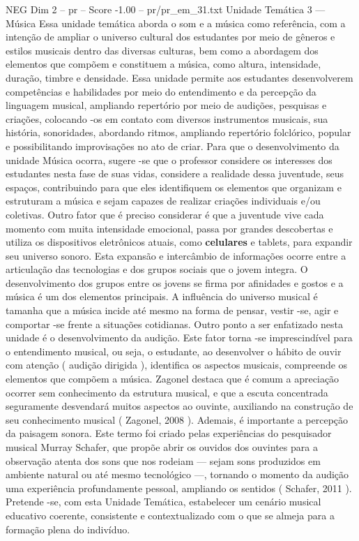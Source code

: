\begin{textsample}{NEG Dim 2 – pr – Score -1.00 – pr/pr\_em\_31.txt}  \label{ex:f2_neg_179}
Unidade Temática 3 — Música Essa unidade temática aborda o som e a música como referência, com a intenção de ampliar o universo cultural dos estudantes por meio de gêneros e estilos musicais dentro das diversas culturas, bem como a abordagem dos elementos que compõem e constituem a música, como altura, intensidade, duração, timbre e densidade.
Essa unidade permite aos estudantes desenvolverem competências e habilidades por meio do entendimento e da percepção da linguagem musical, ampliando repertório por meio de audições, pesquisas e criações, colocando -os em contato com diversos instrumentos musicais, sua história, sonoridades, abordando ritmos, ampliando repertório folclórico, popular e possibilitando improvisações no ato de criar.
Para que o desenvolvimento da unidade Música ocorra, sugere -se que o professor considere os interesses dos estudantes nesta fase de suas vidas, considere a realidade dessa juventude, seus espaços, contribuindo para que eles identifiquem os elementos que organizam e estruturam a música e sejam capazes de realizar criações individuais e/ou coletivas.
Outro fator que é preciso considerar é que a juventude vive cada momento com muita intensidade emocional, passa por grandes descobertas e utiliza os dispositivos eletrônicos atuais, como \textbf{celulares} e tablets, para expandir seu universo sonoro.
Esta expansão e intercâmbio de informações ocorre entre a articulação das tecnologias e dos grupos sociais que o jovem integra.
O desenvolvimento dos grupos entre os jovens se firma por afinidades e gostos e a música é um dos elementos principais.
A influência do universo musical é tamanha que a música incide até mesmo na forma de pensar, vestir -se, agir e comportar -se frente a situações cotidianas.
Outro ponto a ser enfatizado nesta unidade é o desenvolvimento da audição.
Este fator torna -se imprescindível para o entendimento musical, ou seja, o estudante, ao desenvolver o hábito de ouvir com atenção ( audição dirigida ), identifica os aspectos musicais, compreende os elementos que compõem a música.
Zagonel destaca que é comum a apreciação ocorrer sem conhecimento da estrutura musical, e que a escuta concentrada seguramente desvendará muitos aspectos ao ouvinte, auxiliando na construção de seu conhecimento musical ( Zagonel, 2008 ).
Ademais, é importante a percepção da paisagem sonora.
Este termo foi criado pelas experiências do pesquisador musical Murray Schafer, que propõe abrir os ouvidos dos ouvintes para a observação atenta dos sons que nos rodeiam — sejam sons produzidos em ambiente natural ou até mesmo tecnológico —, tornando o momento da audição uma experiência profundamente pessoal, ampliando os sentidos ( Schafer, 2011 ).
Pretende -se, com esta Unidade Temática, estabelecer um cenário musical educativo coerente, consistente e contextualizado com o que se almeja para a formação plena do indivíduo.

\end{textsample}
